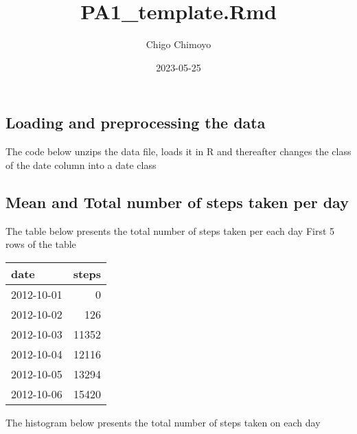 \documentclass[
]{article}
\title{PA1\_template.Rmd}
\author{Chigo Chimoyo}
\date{2023-05-25}
\newenvironment{Shaded}{\begin{snugshade}}{\end{snugshade}}
\newcommand{\AttributeTok}[1]{\textcolor[rgb]{0.77,0.63,0.00}{#1}}
\newcommand{\FunctionTok}[1]{\textcolor[rgb]{0.00,0.00,0.00}{#1}}
\newcommand{\NormalTok}[1]{#1}
\newcommand{\OtherTok}[1]{\textcolor[rgb]{0.56,0.35,0.01}{#1}}
\newcommand{\SpecialCharTok}[1]{\textcolor[rgb]{0.00,0.00,0.00}{#1}}
\newcommand{\StringTok}[1]{\textcolor[rgb]{0.31,0.60,0.02}{#1}}
\begin{document}
\maketitle

\hypertarget{loading-and-preprocessing-the-data}{%
\subsection{Loading and preprocessing the
data}\label{loading-and-preprocessing-the-data}}

The code below unzips the data file, loads it in R and thereafter
changes the class of the date column into a date class

\begin{Shaded}
\end{Shaded}

\hypertarget{mean-and-total-number-of-steps-taken-per-day}{%
\subsection{Mean and Total number of steps taken per
day}\label{mean-and-total-number-of-steps-taken-per-day}}

The table below presents the total number of steps taken per each day
First 5 rows of the table

\begin{longtable}[]{@{}lr@{}}
\toprule()
date & steps \\
\midrule()
\endhead
2012-10-01 & 0 \\
2012-10-02 & 126 \\
2012-10-03 & 11352 \\
2012-10-04 & 12116 \\
2012-10-05 & 13294 \\
2012-10-06 & 15420 \\
\bottomrule()
\end{longtable}

The histogram below presents the total number of steps taken on each day
\end{document}
